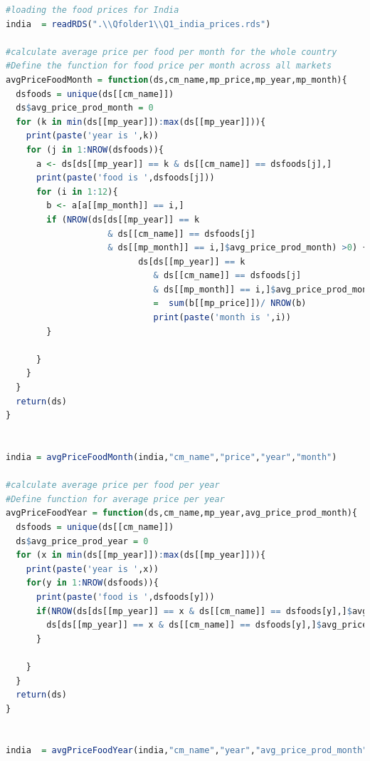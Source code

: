 \documentclass[11pt]{article}
\begin{document}
\begin{lstlisting}[language= R]
#loading the food prices for India
india  = readRDS(".\\Qfolder1\\Q1_india_prices.rds")

#calculate average price per food per month for the whole country
#Define the function for food price per month across all markets
avgPriceFoodMonth = function(ds,cm_name,mp_price,mp_year,mp_month){
  dsfoods = unique(ds[[cm_name]])
  ds$avg_price_prod_month = 0
  for (k in min(ds[[mp_year]]):max(ds[[mp_year]])){                      
    print(paste('year is ',k))
    for (j in 1:NROW(dsfoods)){                                           
      a <- ds[ds[[mp_year]] == k & ds[[cm_name]] == dsfoods[j],]
      print(paste('food is ',dsfoods[j]))
      for (i in 1:12){                                                
        b <- a[a[[mp_month]] == i,]
        if (NROW(ds[ds[[mp_year]] == k 
                    & ds[[cm_name]] == dsfoods[j] 
                    & ds[[mp_month]] == i,]$avg_price_prod_month) >0) {
                          ds[ds[[mp_year]] == k 
                             & ds[[cm_name]] == dsfoods[j] 
                             & ds[[mp_month]] == i,]$avg_price_prod_month 
                             =  sum(b[[mp_price]])/ NROW(b)
                             print(paste('month is ',i))  
        }
        
      }
    }
  }
  return(ds)
}


india = avgPriceFoodMonth(india,"cm_name","price","year","month")

#calculate average price per food per year 
#Define function for average price per year
avgPriceFoodYear = function(ds,cm_name,mp_year,avg_price_prod_month){
  dsfoods = unique(ds[[cm_name]]) 
  ds$avg_price_prod_year = 0
  for (x in min(ds[[mp_year]]):max(ds[[mp_year]])){
    print(paste('year is ',x))
    for(y in 1:NROW(dsfoods)){
      print(paste('food is ',dsfoods[y]))
      if(NROW(ds[ds[[mp_year]] == x & ds[[cm_name]] == dsfoods[y],]$avg_price_prod_year) > 0){
        ds[ds[[mp_year]] == x & ds[[cm_name]] == dsfoods[y],]$avg_price_prod_year = sum(ds[ds[[mp_year]] == x & ds[[cm_name]] == dsfoods[y],][[avg_price_prod_month]]) / NROW(ds[ds[[mp_year]] == x & ds[[cm_name]] == dsfoods[y],][[avg_price_prod_month]])
      }
      
    }
  }
  return(ds)
}


india  = avgPriceFoodYear(india,"cm_name","year","avg_price_prod_month")


\end{lstlisting}
\end{document}
